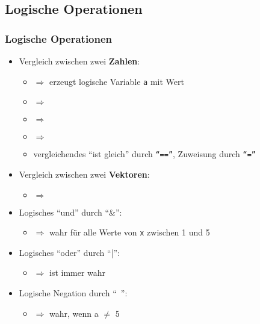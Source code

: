       \subsection{Logische Operationen}
      \begin{frame}
          \frametitle{Logische Operationen}
          \begin{itemize}
            \item Vergleich zwischen zwei \textbf{Zahlen}:
            \begin{itemize}
              \item {} $\Rightarrow$ erzeugt logische Variable \texttt{a} mit Wert 
              \item {} $\Rightarrow$ 
              \item {} $\Rightarrow$ 
              \item {} $\Rightarrow$ 
              \item vergleichendes ``ist gleich'' durch \texttt{``==''}, Zuweisung durch \texttt{``=''}
            \end{itemize}
            \item Vergleich zwischen zwei \textbf{Vektoren}:
            \begin{itemize}
              \item \matlabInput{[1:4]<[5:-2:-1]} $\Rightarrow$ 
            \end{itemize}
            \item Logisches ``und'' durch ``\string&'':
            \begin{itemize}
              \item {} $\Rightarrow$ wahr für alle Werte von \texttt{x} zwischen 1 und 5
            \end{itemize}
            \item Logisches ``oder'' durch ``\string|'':
            \begin{itemize}
              \item {} $\Rightarrow$ ist immer wahr
            \end{itemize}
            \item Logische Negation durch ``\string~'':
            \begin{itemize}
              \item {} $\Rightarrow$ wahr, wenn a $\neq$ 5
            \end{itemize}
          \end{itemize}
      \end{frame}



